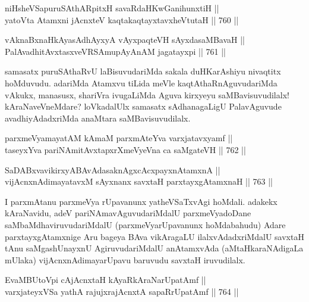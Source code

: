 
\begin{shl}
niHsheVSapuruSAthARpitxH savaRdaHKwGanihunxtiH || \\
yatoV\s ta Atamxni jAcnxteV kaqtakaqtayxtavxheVtutaH \hfill || 760 ||  
\end{shl}
				
\begin{shl}
vAknaBxnaHkAyasAdhAyxyA vAyxpaqteVH sAyxdasaMBavaH || \\
PalAvadhitAvxtasxveVRSAmupAyAnAM jagatayxpi \hfill || 761 ||  
\end{shl}

\begin{artha} 
samasatx puruSAthaRvU laBisuvudariMda sakala duHKarAshiyu nivaqtitx hoMduvudu. adariMda Atamxvu tiLida meVle kaqtAthaRnAguvudariMda vAkukx, manasusx, shariVra ivugaLiMda Aguva kirxyeyu saMBavisuvudilalx! kAraNaveVneMdare? loVkadalUlx samasatx sAdhanagaLigU PalavAguvude avadhiyAdadxriMda anaMtara saMBavisuvudilalx.
\end{artha}


\begin{shl}
parxmeVyamayatAM kAmaM parxmAteYva varxjatavxyamf || \\
taseyxYva pariNAmitAvxtapxrXmeVyeVna ca saMgateVH \hfill || 762 ||  
\end{shl}

\begin{shl}
SaDABxvavikirxyABAvAdasaknAgxcAcxpayxnAtamxnA || \\
vijAcnxnAdimayatavxM sAyxnanx savxtaH parxtayxgAtamxnaH \hfill || 763 ||  
\end{shl}

\begin{artha} 
I parxmAtanu parxmeVya rUpavanunx yatheVSaTxvAgi hoMdali. adakekx kAraNavidu, adeV pariNAmavAguvudariMdalU parxmeVyadoDane saMbaMdhaviruvudariMdalU (parxmeVyarUpavanunx hoMdabahudu) Adare parxtayxgAtamxnige Aru bageya BAva vikAragaLU ilalxvAdadxriMdalU savxtaH tAnu saMgashUnayxnU AgiruvudariMdalU anAtamxvAda (aMtaHkaraNAdigaLa mUlaka) vijAcnxnAdimayarUpavu baruvudu savxtaH iruvudilalx.
\end{artha}

\begin{shl}
EvaMBUtoV\s pi cAjAcnxtaH kAyaRkAraNarUpatAmf || \\
varxjateyxVSa yathA rajujxrajAcnxtA sapaRrUpatAmf \hfill || 764 ||  
\end{shl}

